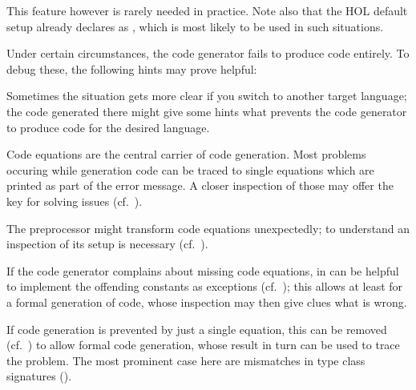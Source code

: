 \begin{isabellebody}
\isamarkuptrue%
%
\endisatagquote
{\isafoldquote}%
%
\isadelimquote
%
\endisadelimquote
%
\begin{isamarkuptext}%
\noindent This feature however is rarely needed in practice.  Note
  also that the HOL default setup already declares 
  as \hyperlink{command.code-abort}{\mbox{}}, which is most likely to be used in such
  situations.%
\end{isamarkuptext}%
\isamarkuptrue%
%
\isamarkuptrue%
%
\begin{isamarkuptext}%
Under certain circumstances, the code generator fails to produce
  code entirely.  To debug these, the following hints may prove
  helpful:

  \begin{description}

      Sometimes
      the situation gets more clear if you switch to another target
      language; the code generated there might give some hints what
      prevents the code generator to produce code for the desired
      language.

      Code equations are the central
      carrier of code generation.  Most problems occuring while generation
      code can be traced to single equations which are printed as part of
      the error message.  A closer inspection of those may offer the key
      for solving issues (cf.~).

      The preprocessor might
      transform code equations unexpectedly; to understand an
      inspection of its setup is necessary (cf.~).

      If the code generator
      complains about missing code equations, in can be helpful to
      implement the offending constants as exceptions
      (cf.~); this allows at least for a formal
      generation of code, whose inspection may then give clues what is
      wrong.

      If code
      generation is prevented by just a single equation, this can be
      removed (cf.~) to allow formal code
      generation, whose result in turn can be used to trace the
      problem.  The most prominent case here are mismatches in type
      class signatures ().

  \end{description}%
\end{isamarkuptext}%
\isamarkuptrue%
%
\isadelimtheory
%
\endisadelimtheory
%
\isatagtheory
{}\isamarkupfalse%
%
\endisatagtheory
{\isafoldtheory}%
%
\isadelimtheory
%
\endisadelimtheory
\isanewline
\end{isabellebody}%

